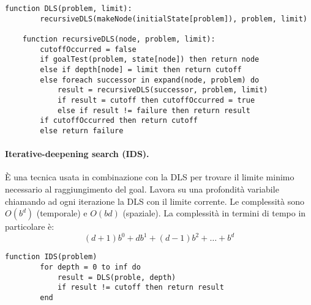 \documentclass[a4paper, 11pt]{article}
\begin{document}
\begin{lstlisting}[frame=tb, caption={Recursive implementation of DLS}]
	function DLS(problem, limit):
		recursiveDLS(makeNode(initialState[problem]), problem, limit)
		
	function recursiveDLS(node, problem, limit):
		cutoffOccurred = false
		if goalTest(problem, state[node]) then return node
		else if depth[node] = limit then return cutoff
		else foreach successor in expand(node, problem) do
			result = recursiveDLS(successor, problem, limit)
			if result = cutoff then cutoffOccurred = true
			else if result != failure then return result
		if cutoffOccurred then return cutoff
		else return failure		
\end{lstlisting}

\paragraph{Iterative-deepening search (IDS).} È una tecnica usata in combinazione con la DLS per trovare il limite minimo necessario al raggiungimento del goal. Lavora su una profondità variabile chiamando ad ogni iterazione la DLS con il limite corrente. Le complessità sono $O(b^d)$ (temporale) e $O(bd)$ (spaziale). La complessità in termini di tempo in particolare è:
\[
	(d+1) b^0 + db^1 + (d-1)b^2 + \dots + b^d
\]

\begin{lstlisting}[frame=tb, caption={IDS}]
	function IDS(problem)
		for depth = 0 to inf do
			result = DLS(proble, depth)
			if result != cutoff then return result
		end
\end{lstlisting}
\end{document}
